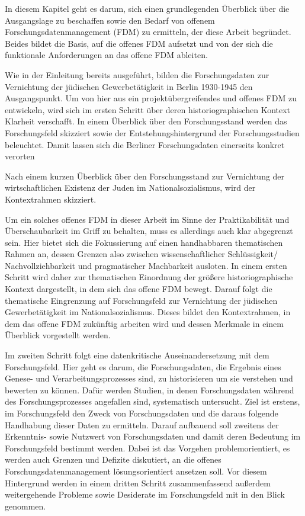 \onehalfspacing

In diesem Kapitel geht es darum, sich einen grundlegenden Überblick über die Ausgangslage zu beschaffen sowie den Bedarf von offenem Forschungsdatenmanagement (FDM) zu ermitteln, der diese Arbeit begründet. Beides bildet die Basis, auf die offenes FDM aufsetzt und von der sich die funktionale Anforderungen an das offene FDM ableiten. 

Wie in der Einleitung bereits ausgeführt, bilden die Forschungsdaten zur Vernichtung der jüdischen Gewerbetätigkeit in Berlin 1930-1945 den Ausgangspunkt. Um von hier aus ein projektübergreifendes und offenes FDM zu entwickeln, wird sich im ersten Schritt über deren historiographischen Kontext Klarheit verschafft. In einem Überblick über den Forschungsstand werden das Forschungsfeld skizziert sowie der Entstehungshintergrund der Forschungsstudien beleuchtet. Damit lassen sich die Berliner Forschungsdaten einerseits konkret verorten


Nach einem kurzen Überblick über den Forschungsstand zur Vernichtung der wirtschaftlichen Existenz der Juden im Nationalsozialismus, wird der Kontextrahmen skizziert. 




Um ein solches offenes FDM in dieser Arbeit im Sinne der Praktikabilität und Überschaubarkeit im Griff zu behalten, muss es allerdings auch klar abgegrenzt sein. Hier bietet sich die Fokussierung auf einen handhabbaren thematischen Rahmen an, dessen Grenzen also zwischen wissenschaftlicher Schlüssigkeit/ Nachvollziehbarkeit und pragmatischer Machbarkeit ausloten. In einem ersten Schritt wird daher zur thematischen Einordnung der größere  historiographische Kontext dargestellt, in dem sich das offene FDM bewegt. Darauf folgt die thematische Eingrenzung auf Forschungsfeld zur Vernichtung der jüdischen Gewerbetätigkeit im Nationalsozialismus. Dieses bildet den Kontextrahmen, in dem das offene FDM zukünftig arbeiten wird und dessen Merkmale in einem Überblick vorgestellt werden.

Im zweiten Schritt folgt eine datenkritische Auseinandersetzung mit dem Forschungsfeld. Hier geht es darum, die Forschungsdaten, die Ergebnis eines Genese- und Verarbeitungsprozesses sind, zu historisieren um sie verstehen und bewerten zu können. Dafür werden Studien, in denen Forschungsdaten während des Forschungsprozesses angefallen sind, systematisch untersucht. Ziel ist erstens, im Forschungsfeld den Zweck von Forschungsdaten und die daraus folgende Handhabung dieser Daten zu ermitteln. Darauf aufbauend soll zweitens der Erkenntnis- sowie Nutzwert von Forschungsdaten und damit deren Bedeutung im Forschungsfeld bestimmt werden. Dabei ist das Vorgehen problemorientiert, es werden auch Grenzen und Defizite diskutiert, an die offenes Forschungsdatenmanagement lösungsorientiert ansetzen soll. Vor diesem Hintergrund werden in einem dritten Schritt zusammenfassend außerdem weitergehende Probleme sowie Desiderate im Forschungsfeld mit in den Blick genommen.

